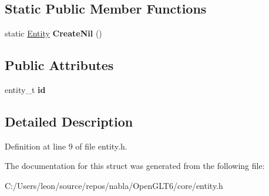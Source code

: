 \subsection*{Static Public Member Functions}
\begin{DoxyCompactItemize}
\item 
\mbox{\label{structnabla_1_1_entity_a9aac144b71c0e0b5ebe784f0bcf65227}} 
static \mbox{\hyperlink{structnabla_1_1_entity}{Entity}} {\bfseries Create\+Nil} ()
\end{DoxyCompactItemize}
\subsection*{Public Attributes}
\begin{DoxyCompactItemize}
\item 
\mbox{\label{structnabla_1_1_entity_a5576308d2820eb25c2695f97a5a18e29}} 
entity\+\_\+t {\bfseries id}
\end{DoxyCompactItemize}


\subsection{Detailed Description}


Definition at line 9 of file entity.\+h.



The documentation for this struct was generated from the following file\+:\begin{DoxyCompactItemize}
\item 
C\+:/\+Users/leon/source/repos/nabla/\+Open\+G\+L\+T6/core/entity.\+h\end{DoxyCompactItemize}
